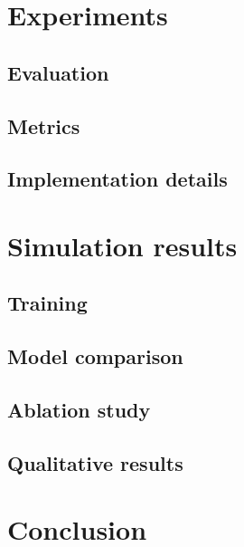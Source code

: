 \section{Experiments}
\subsection{Evaluation}
\subsection{Metrics}
\subsection{Implementation details}

\section{Simulation results}
\subsection{Training}
\subsection{Model comparison}
\subsection{Ablation study}
\subsection{Qualitative results}

\section{Conclusion} \label{sec:concl}

\todomarker{}